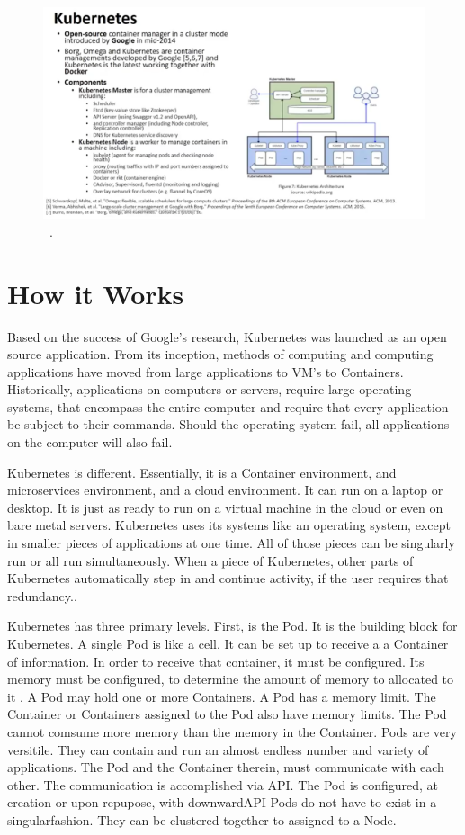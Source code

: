 \begin{figure}[!ht]
\centering\includegraphics[width=\columnwidth]{images/kubernetes.png}~\cite{definition}.
\end{figure}

\section{How it Works}

 
Based on the success of Google's research, Kubernetes was launched as
an open source application.  From its inception, methods of computing 
and computing applications have moved from large applications to VM's
to Containers.  Historically, applications on computers or servers, require
large operating systems, that encompass the entire computer and
require that every application be subject to their commands.  Should
the operating system fail, all applications on the computer will also
fail.   

Kubernetes is different.  Essentially, it is a Container environment,
and microservices environment, and a cloud environment.  It can run on
a laptop or desktop.  It is just as ready to run on a virtual machine
in the cloud or even on bare metal servers.  Kubernetes uses its
systems like an operating system, except in smaller pieces of
applications at one time.  All of those pieces can be singularly run
or all run simultaneously.  When a piece of Kubernetes, other parts of
Kubernetes automatically step in and continue activity, if the user
requires that redundancy.\cite{concept}.

Kubernetes has three primary levels.  First, is the Pod.  It is the
building block for Kubernetes.  A single Pod is like a cell.  It can
be set up to receive a a Container of information.  In order to
receive that container, it must be configured.  Its memory must be
configured, to determine the amount of memory to allocated to it
\cite{pods}.  A Pod may hold one or more Containers.  A Pod has a
memory limit.  The Container or Containers assigned to the Pod also
have memory limits.  The Pod cannot comsume more memory than the
memory in the Container.  Pods are very versitile.  They can contain
and run an almost endless number and variety of applications.  The Pod
and the Container therein, must communicate with each other.  The
communication is accomplished via API.  The Pod is configured, at
creation or upon repupose, with downwardAPI Pods do not have to exist
in a singularfashion.  They can be clustered together to assigned to a Node.  


